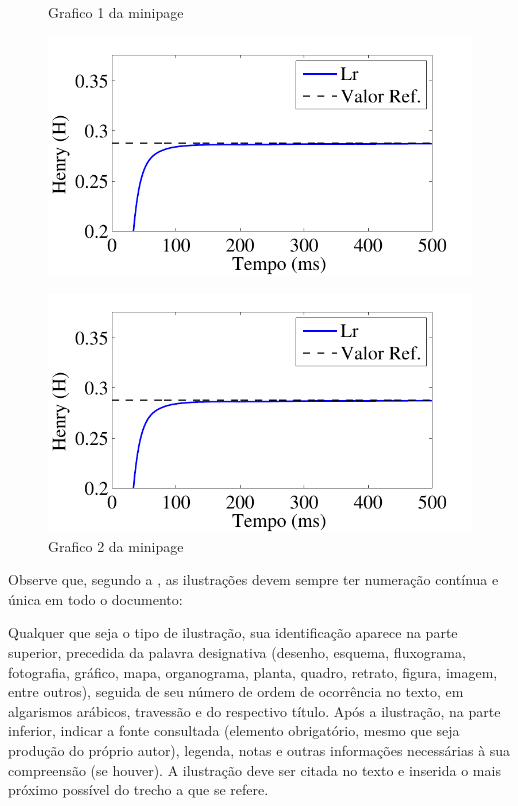 \begin{figure}[htb]
 \label{teste}
 \centering
  \begin{minipage}{0.45\textwidth}
    \centering
    \caption{Grafico 1 da minipage} \label{fig_minipage_grafico1}
    \includegraphics[scale=0.15]{./Figuras/abntex2-modelo-img-grafico.pdf}
  \end{minipage}
  \hfill
  \begin{minipage}{0.45\textwidth}
    \centering
    \caption{Grafico 2 da minipage} \label{fig_minipage_grafico2}
    \includegraphics[scale=0.15]{./Figuras/abntex2-modelo-img-grafico.pdf}
  \end{minipage}
\end{figure}

Observe que, segundo a , as
ilustrações devem sempre ter numeração contínua e única em todo o documento:

\begin{citacao}
Qualquer que seja o tipo de ilustração, sua identificação aparece na parte
superior, precedida da palavra designativa (desenho, esquema, fluxograma,
fotografia, gráfico, mapa, organograma, planta, quadro, retrato, figura,
imagem, entre outros), seguida de seu número de ordem de ocorrência no texto,
em algarismos arábicos, travessão e do respectivo título. Após a ilustração, na
parte inferior, indicar a fonte consultada (elemento obrigatório, mesmo que
seja produção do próprio autor), legenda, notas e outras informações
necessárias à sua compreensão (se houver). A ilustração deve ser citada no
texto e inserida o mais próximo possível do trecho a que se
refere. \cite[seções 5.8]{NBR14724:2011}
\end{citacao}

